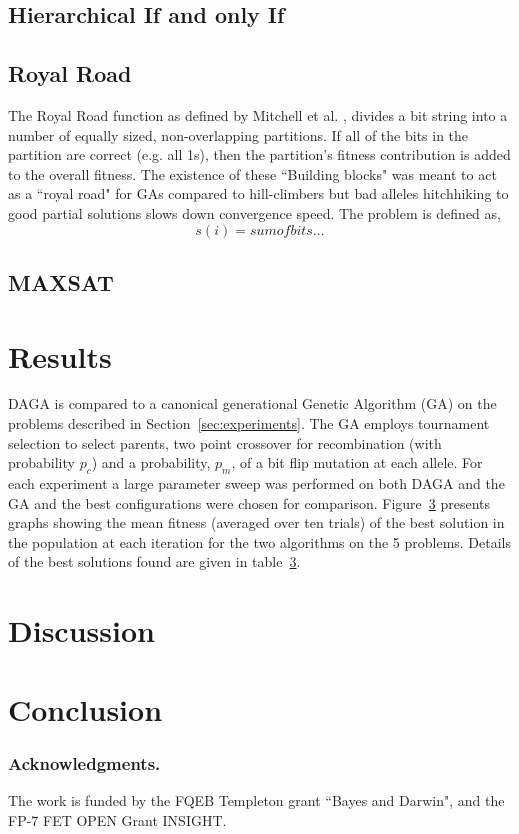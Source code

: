 \documentclass[runningheads,a4paper]{llncs}
\begin{document}
\subsection{Hierarchical If and only If}

\subsection{Royal Road}
The Royal Road function as defined by Mitchell et al. \cite{mitchell}, divides a bit string into a number of  equally sized, non-overlapping partitions. If all of the bits in the partition are correct (e.g. all 1s), then the partition's fitness contribution is added to the overall fitness. The existence of these ``Building blocks" was meant to act as a ``royal road" for GAs compared to hill-climbers but bad alleles hitchhiking to good partial solutions slows down convergence speed. The problem is defined as,
\\
\[
s(i) = sum of bits...
\]
 
\subsection{MAXSAT}

\section{Results}
DAGA is compared to a canonical generational Genetic Algorithm (GA) on the problems described in Section~\ref{sec:experiments}. The GA employs tournament selection to select parents, two point crossover for recombination (with probability \(p_c\)) and a probability, \(p_m\), of a bit flip mutation at each allele. For each experiment a large parameter sweep was performed on both DAGA and the GA and the best configurations were chosen for comparison. Figure~\ref{} presents graphs showing the mean fitness (averaged over ten trials) of the best solution in the population at each iteration for the two algorithms on the 5 problems. Details of the best solutions found are given in table~\ref{}. 
\section{Discussion}
\section{Conclusion}

\subsubsection*{Acknowledgments.} The work is funded by the FQEB Templeton grant ``Bayes and Darwin", and the FP-7 FET OPEN Grant INSIGHT.



\end{document}
